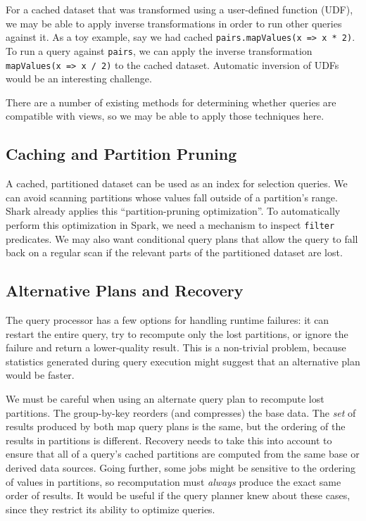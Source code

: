 \documentclass[12pt]{article}
\begin{document}
For a cached dataset that was transformed using a user-defined function (UDF),
we may be able to apply inverse transformations in order to run other queries
against it.  As a toy example, say we had cached \texttt{pairs.mapValues(x =>
x * 2)}.  To run a query against \texttt{pairs}, we can apply the inverse
transformation \texttt{mapValues(x => x / 2)} to the cached dataset.
Automatic inversion of UDFs would be an interesting challenge.

There are a number of existing methods for determining whether queries are
compatible with views, so we may be able to apply those techniques here.

\subsection{Caching and Partition Pruning}

A cached, partitioned dataset can be used as an index for
selection queries.  We can avoid scanning partitions whose values fall outside
of a partition's range.  Shark already applies this ``partition-pruning
optimization''.  To automatically perform this optimization in Spark, we need
a mechanism to inspect \texttt{filter} predicates.  We may also want
conditional query plans that allow the query to fall back on a regular scan if
the relevant parts of the partitioned dataset are lost.

\subsection{Alternative Plans and Recovery}

The query processor has a few options for handling runtime failures: it can
restart the entire query, try to recompute only the lost partitions, or ignore
the failure and return a lower-quality result.  This is a non-trivial problem,
because statistics generated during query execution might suggest that an
alternative plan would be faster.

We must be careful when using an alternate query plan to recompute lost
partitions.
The group-by-key reorders (and compresses) the base data.  The \emph{set} of
results produced by both map query plans is the same, but the ordering of the
results in partitions is different.  Recovery needs to take this into account
to ensure that all of a query's cached partitions are computed from the same
base or derived data sources.  Going further, some jobs might be sensitive to
the ordering of values in partitions, so recomputation must \emph{always}
produce the exact same order of results.  It would be useful if the query
planner knew about these cases, since they restrict its ability to optimize
queries.
\end{document}
